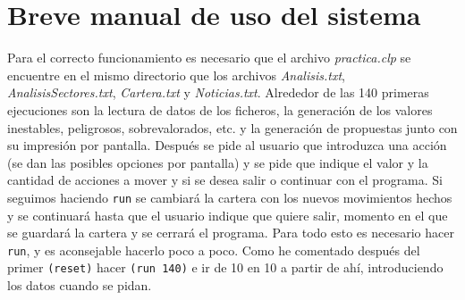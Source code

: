 \documentclass[12pt]{article}
\begin{document}
\section{Breve manual de uso del sistema}
Para el correcto funcionamiento es necesario que el archivo \textit{practica.clp} se encuentre en el mismo directorio que los archivos \textit{Analisis.txt}, \textit{AnalisisSectores.txt}, \textit{Cartera.txt} y \textit{Noticias.txt}. Alrededor de las 140 primeras ejecuciones son la lectura de datos de los ficheros, la generación de los valores inestables, peligrosos, sobrevalorados, etc. y la generación de propuestas junto con su impresión por pantalla. Después se pide al usuario que introduzca una acción (se dan las posibles opciones por pantalla) y se pide que indique el valor y la cantidad de acciones a mover y si se desea salir o continuar con el programa. Si seguimos haciendo \texttt{run} se cambiará la cartera con los nuevos movimientos hechos y se continuará hasta que el usuario indique que quiere salir, momento en el que se guardará la cartera y se cerrará el programa. Para todo esto es necesario hacer \texttt{run}, y es aconsejable hacerlo poco a poco. Como he comentado después del primer \texttt{(reset)} hacer \texttt{(run 140)} e ir de 10 en 10 a partir de ahí, introduciendo los datos cuando se pidan.
\end{document}

